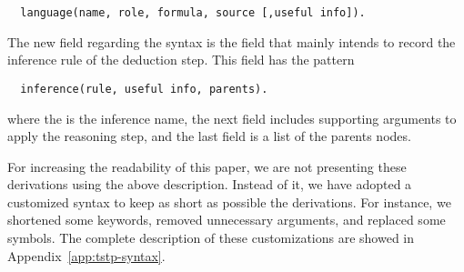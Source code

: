 \documentclass[../main.tex]{subfiles}
\begin{document}
\begin{verbatim}
  language(name, role, formula, source [,useful info]).
\end{verbatim}

The new field regarding the \TPTP syntax is the  field
that mainly intends to record the inference rule of the deduction step.
This field has the pattern

\begin{verbatim}
  inference(rule, useful info, parents).
\end{verbatim}

where the  is the inference name, the next field
includes supporting arguments to apply the reasoning step, and the
last field is a list of the parents nodes.

For increasing the readability of this paper, we are not presenting these \TSTP
derivations using the above description. Instead of it, we have adopted a
customized \TSTP syntax to keep as short as possible the \Metis derivations. For
instance,  we shortened some keywords, removed unnecessary arguments, and
replaced some symbols. The complete description of these customizations are
showed in Appendix~\ref{app:tstp-syntax}.
\end{document}
